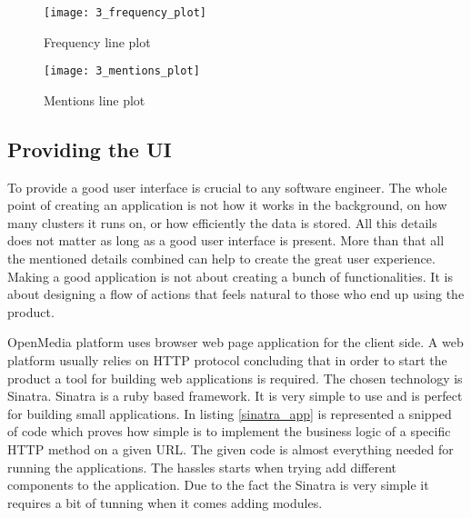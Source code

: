 \begin{figure}[!ht]
\centering
\texttt{[image: 3\_frequency\_plot]}
\caption{Frequency line plot}\label{frequency_plot}
\end{figure}

\begin{figure}[!ht]
\centering
\texttt{[image: 3\_mentions\_plot]}
\caption{Mentions line plot}\label{mentions_plot}
\end{figure}

\clearpage
\subsection{Providing the UI}
To provide a good user interface is crucial to any software engineer. The whole point of creating an application is not how it works in the background, on how many clusters it runs on, or how efficiently the data is stored. All this details does not matter as long as a good user interface is present. More than that all the mentioned details combined can help to create the great user experience. Making a good application is not about creating a bunch of functionalities. It is about designing a flow of actions that feels natural to those who end up using the product.

OpenMedia platform uses browser web page application for the client side. A web platform usually relies on HTTP protocol concluding that in order to start the product a tool for building web applications is required. The chosen technology is Sinatra\cite{sinatra}. Sinatra is a ruby based framework. It is very simple to use and is perfect for building small applications. In listing \ref{sinatra_app} is represented a snipped of code which proves how simple is to implement the business logic of a specific HTTP method on a given URL. The given code is almost everything needed for running the applications. The hassles starts when trying add different components to the application. Due to the fact the Sinatra is very simple it requires a bit of tunning when it comes adding modules.




